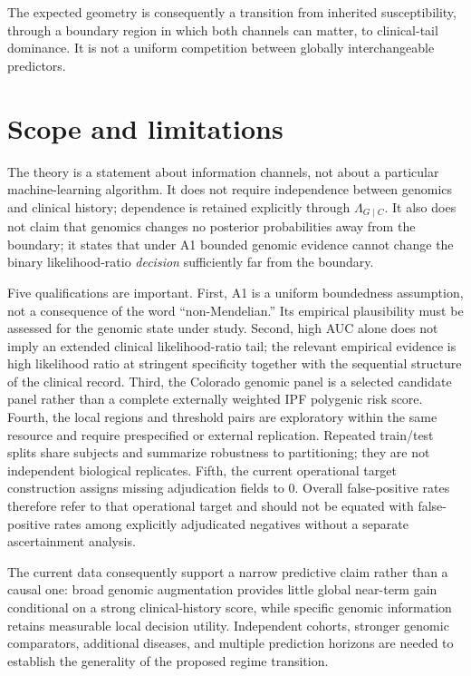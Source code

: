 \documentclass[journal]{IEEEtran}
\newcommand{\LR}{\Lambda}
\begin{document}
The expected geometry is consequently a transition from inherited susceptibility, through a boundary region in which both channels can matter, to clinical-tail dominance. It is not a uniform competition between globally interchangeable predictors.

\section{Scope and limitations}

The theory is a statement about information channels, not about a particular machine-learning algorithm. It does not require independence between genomics and clinical history; dependence is retained explicitly through $\LR_{G\mid C}$. It also does not claim that genomics changes no posterior probabilities away from the boundary; it states that under A1 bounded genomic evidence cannot change the binary likelihood-ratio \emph{decision} sufficiently far from the boundary.

Five qualifications are important. First, A1 is a uniform boundedness assumption, not a consequence of the word ``non-Mendelian.'' Its empirical plausibility must be assessed for the genomic state under study. Second, high AUC alone does not imply an extended clinical likelihood-ratio tail; the relevant empirical evidence is high likelihood ratio at stringent specificity together with the sequential structure of the clinical record. Third, the Colorado genomic panel is a selected candidate panel rather than a complete externally weighted IPF polygenic risk score. Fourth, the local regions and threshold pairs are exploratory within the same resource and require prespecified or external replication. Repeated train/test splits share subjects and summarize robustness to partitioning; they are not independent biological replicates. Fifth, the current operational target construction assigns missing adjudication fields to 0. Overall false-positive rates therefore refer to that operational target and should not be equated with false-positive rates among explicitly adjudicated negatives without a separate ascertainment analysis.

The current data consequently support a narrow predictive claim rather than a causal one: broad genomic augmentation provides little global near-term gain conditional on a strong clinical-history score, while specific genomic information retains measurable local decision utility. Independent cohorts, stronger genomic comparators, additional diseases, and multiple prediction horizons are needed to establish the generality of the proposed regime transition.
\end{document}
